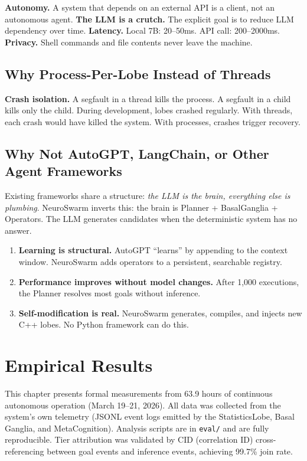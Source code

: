 \documentclass[12pt,a4paper]{report}
\begin{document}
\textbf{Autonomy.} A system that depends on an external API is a client, not an autonomous agent. \textbf{The LLM is a crutch.} The explicit goal is to reduce LLM dependency over time. \textbf{Latency.} Local 7B: 20--50ms. API call: 200--2000ms. \textbf{Privacy.} Shell commands and file contents never leave the machine.

\section{Why Process-Per-Lobe Instead of Threads}

\textbf{Crash isolation.} A segfault in a thread kills the process. A segfault in a child kills only the child. During development, lobes crashed regularly. With threads, each crash would have killed the system. With processes, crashes trigger recovery.

\section{Why Not AutoGPT, LangChain, or Other Agent Frameworks}

Existing frameworks share a structure: \textit{the LLM is the brain, everything else is plumbing}. NeuroSwarm inverts this: the brain is Planner + BasalGanglia + Operators. The LLM generates candidates when the deterministic system has no answer.

\begin{enumerate}
    \item \textbf{Learning is structural.} AutoGPT ``learns'' by appending to the context window. NeuroSwarm adds operators to a persistent, searchable registry.
    \item \textbf{Performance improves without model changes.} After 1{,}000 executions, the Planner resolves most goals without inference.
    \item \textbf{Self-modification is real.} NeuroSwarm generates, compiles, and injects new C++ lobes. No Python framework can do this.
\end{enumerate}

\chapter{Empirical Results}

This chapter presents formal measurements from 63.9 hours of continuous autonomous operation (March 19--21, 2026). All data was collected from the system's own telemetry (JSONL event logs emitted by the StatisticsLobe, Basal Ganglia, and MetaCognition). Analysis scripts are in \texttt{eval/} and are fully reproducible. Tier attribution was validated by CID (correlation ID) cross-referencing between goal events and inference events, achieving 99.7\% join rate.
\end{document}
